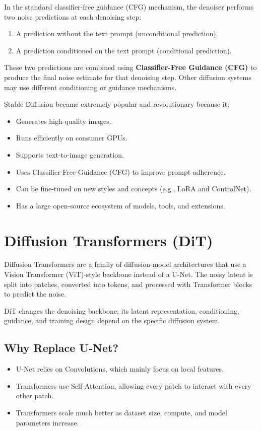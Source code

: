 In the standard classifier-free guidance (CFG) mechanism, the denoiser performs two noise predictions at each denoising step:

\begin{enumerate}
    \item A prediction without the text prompt (unconditional prediction).
    \item A prediction conditioned on the text prompt (conditional prediction).
\end{enumerate}

These two predictions are combined using \textbf{Classifier-Free Guidance (CFG)} to produce the final noise estimate for that denoising step. Other diffusion systems may use different conditioning or guidance mechanisms.

Stable Diffusion became extremely popular and revolutionary because it:

\begin{itemize}
    \item Generates high-quality images.
    \item Runs efficiently on consumer GPUs.
    \item Supports text-to-image generation.
    \item Uses Classifier-Free Guidance (CFG) to improve prompt adherence.
    \item Can be fine-tuned on new styles and concepts (e.g., LoRA and ControlNet).
    \item Has a large open-source ecosystem of models, tools, and extensions.
\end{itemize}

\section{Diffusion Transformers (DiT)}

Diffusion Transformers are a family of diffusion-model architectures that use a Vision Transformer (ViT)-style backbone instead of a U-Net.
The noisy latent is split into patches, converted into tokens, and processed with Transformer blocks to predict the noise.

DiT changes the denoising backbone; its latent representation, conditioning, guidance, and training design depend on the specific diffusion system.

\subsection*{Why Replace U-Net?}
\begin{itemize}
    \item U-Net relies on Convolutions, which mainly focus on local features.
    \item Transformers use Self-Attention, allowing every patch to interact with every other patch.
    \item Transformers scale much better as dataset size, compute, and model parameters increase.
\end{itemize}

